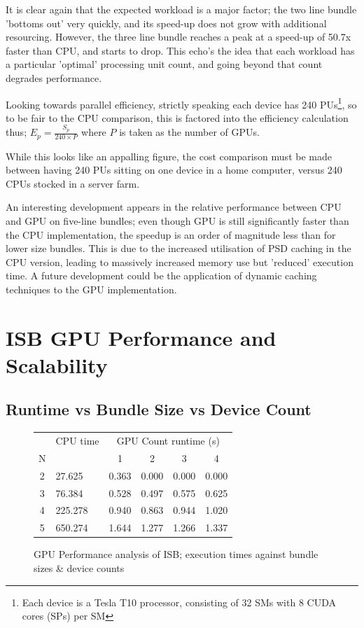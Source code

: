 It is clear again that the expected workload is a major factor; the two line bundle 'bottoms out' very quickly, and its speed-up does not grow with additional resourcing. However, the three line bundle reaches a peak at a speed-up of 50.7x faster than CPU, and starts to drop. This echo’s the idea that each workload has a particular 'optimal' processing unit count, and going beyond that count degrades performance.

Looking towards parallel efficiency, strictly speaking each device has 240 PUs\footnote{Each device is a Tesla T10 processor, consisting of 32 SMs with 8 CUDA cores (SPs) per SM}, so to be fair to the CPU comparison, this is factored into the efficiency calculation thus; \(E_p=\frac{S_p}{240 \times P}\) where \(P\) is taken as the number of GPUs.

While this looks like an appalling figure, the cost comparison must be made between having 240 PUs sitting on one device in a home computer, versus 240 CPUs stocked in a server farm. 

An interesting development appears in the relative performance between CPU and GPU on five-line bundles; even though GPU is still significantly faster than the CPU implementation, the speedup is an order of magnitude less than for lower size bundles. This is due to the increased utilisation of PSD caching in the CPU version, leading to massively increased memory use but 'reduced' execution time. A future development could be the application of dynamic caching techniques to the GPU implementation.


\section{ISB GPU Performance and Scalability}
\subsection{Runtime vs Bundle Size vs Device Count}
\begin{figure}[h!]
\centering
  \begin{tabularx}{0.5\textwidth}{|c|X|c|c|c|c|}
    \hline
  &CPU time&\multicolumn{4}{|c|}{GPU Count runtime (s)}\\
  N&&1&2&3&4\\\hline
  2&27.625&0.363&0.000&0.000&0.000\\
  3&76.384&0.528&0.497&0.575&0.625\\
  4&225.278&0.940&0.863&0.944&1.020\\
  5&650.274&1.644&1.277&1.266&1.337\\\hline
  \end{tabularx}
\caption{GPU Performance analysis of ISB; execution times against bundle sizes \& device counts}
\label{tab:ISBTable}
\end{figure}

